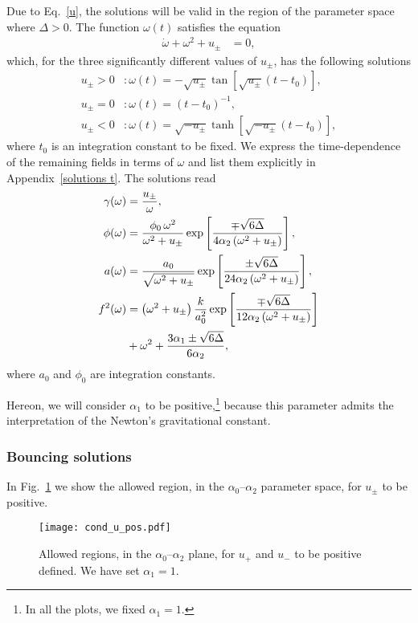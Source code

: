 \documentclass[aps,prd,12pt,superscriptaddress,showpacs,showkeys,longbibliography,reprint,nofootinbib]{revtex4-1}
\begin{document}
Due to Eq.~\eqref{u}, the solutions will be valid in the region of the parameter space where $\Delta>0$. The function $\omega(t)$ satisfies the equation
\begin{align}
  \dot{\omega}+\omega^2+u_{\pm} &= 0,
\end{align}
which, for the three significantly different values of $u_\pm$, has the following solutions
\begin{align}
  u_\pm>0&:\omega(t)=-\sqrt{u_\pm}\tan\left[\sqrt{u_\pm}\left(t-t_0\right)\right],\\
  u_\pm=0&:\omega(t)=\left(t-t_0\right)^{-1},\\
  u_\pm<0&:\omega(t)=\sqrt{-u_\pm}\tanh\left[\sqrt{-u_\pm}\left(t-t_0\right)\right],
\end{align}
where $t_0$ is an integration constant to be fixed. We express the time-dependence of the remaining fields in terms of $\omega$ and list them explicitly in Appendix~\ref{solutions t}. The solutions read
\begin{align}
  \gamma(\omega)&=\frac{u_\pm}{\omega},\\
  \phi(\omega)&=\frac{\phi_0\,\omega^2}{\omega^2+u_\pm}\exp\left[\frac{\mp\sqrt{6\Delta}}{4\alpha_2\left(\omega^2+u_\pm\right)}\right],\\
  a(\omega)&=\frac{a_0}{\sqrt{\omega^2+u_\pm}}\exp\left[\frac{\pm\sqrt{6\Delta}} {24\alpha_2\left(\omega^2+u_\pm\right)}\right],\\
  f^2(\omega)&=\left(\omega^2+u_\pm\right)\frac{k}{a_0^2}\exp\left[\frac{\mp\sqrt{6\Delta}}{12\alpha_2\left(\omega^2+u_\pm\right)}\right]\notag\\
  &+\omega^2  + \frac{3\alpha_1\pm\sqrt{6\Delta}}{6\alpha_2},
\end{align}
where $a_0$ and $\phi_0$ are integration constants.

Hereon, we will consider $\alpha_1$ to be positive,\footnote{In all the plots, we fixed $\alpha_1 = 1$.} because this parameter admits the interpretation of the Newton's gravitational constant.

\subsubsection{Bouncing solutions}

In Fig.~\ref{cond_u_pos} we show the allowed region, in the $\alpha_0$--$\alpha_2$ parameter space, for $u_\pm$ to be positive. 
\begin{figure}[H]
  \texttt{[image: cond\_u\_pos.pdf]}
  \caption{Allowed regions, in the $\alpha_0$--$\alpha_2$ plane, for $u_+$ and $u_-$ to be positive defined. We have set $\alpha_1 = 1$.}
  \label{cond_u_pos}
\end{figure}
\end{document}
